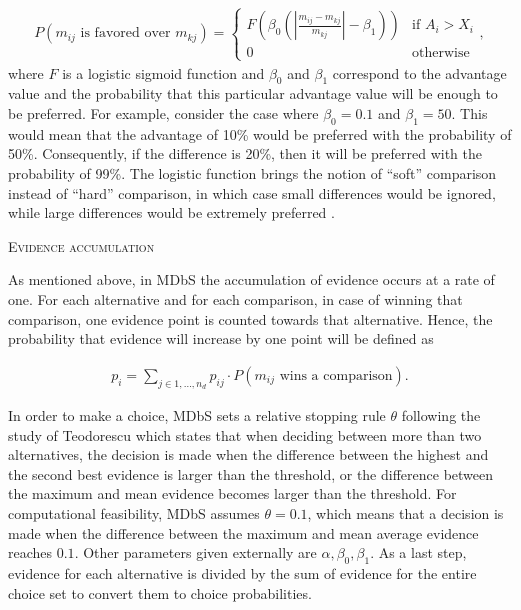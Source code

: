 \documentclass[a4paper,12pt]{article}
\newcommand{\citeyearonly}[1]{\citeyearpar{#1}}
\begin{document}
\begin{align}\label{probabilityOneIsFavored}
    P(m_{ij} \text{ is favored over } m_{kj}) = 
        \begin{cases}
        F(\beta_0 (| \frac{m_{ij} - m_{kj}}{m_{kj}} |- \beta_1)) & \text{if } A_i > X_i \\
        0 & \text{otherwise}
        \end{cases} ,
\end{align}
where $F$ is a logistic sigmoid function and $\beta_0$ and $\beta_1$ correspond to the advantage value and the probability that this particular advantage value will be enough to be preferred. For example, consider the case where $\beta_0 = 0.1$ and $\beta_1 = 50$. This would mean that the advantage of 10\% would be preferred with the probability of 50\%. Consequently, if the difference is 20\%, then it will be preferred with the probability of 99\%. The logistic function brings the notion of ``soft'' comparison instead of ``hard'' comparison, in which case small differences would be ignored, while large differences would be extremely preferred \citep{noguchi2018multialternative}.

\textsc{Evidence accumulation}

As mentioned above, in MDbS the accumulation of evidence occurs at a rate of one. For each alternative and for each comparison, in case of winning that comparison, one evidence point is counted towards that alternative. Hence, the probability that evidence will increase by one point will be defined as 

\begin{align}\label{probabilityOfEvidenceIncreasing}
    p_i = \sum_{j \in {1, \ldots, n_d}} p_{ij} \cdot P(m_{ij} \text{ wins a comparison}).
\end{align}

In order to make a choice, MDbS sets a relative stopping rule $\theta$ following the study of Teodorescu \citeyearonly{teodorescu2013disentangling} which states that when deciding between more than two alternatives, the decision is made when the difference between the highest and the second best evidence is larger than the threshold, or the difference between the maximum and mean evidence becomes larger than the threshold. For computational feasibility, MDbS assumes $\theta = 0.1$, which means that a decision is made when the difference between the maximum and mean average evidence reaches $0.1$. Other parameters given externally are $\alpha, \beta_0, \beta_1$. As a last step, evidence for each alternative is divided by the sum of evidence for the entire choice set to convert them to choice probabilities.
\end{document}

